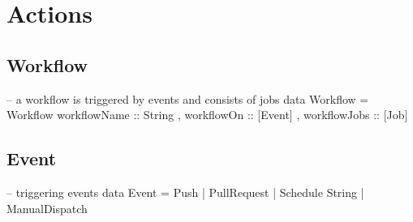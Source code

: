 \documentclass[openany, 12pt]{book}
\begin{document}
\part{Actions}
\chapter{Workflow}

\begin{haskell}{}
-- a workflow is triggered by events and consists of jobs
data Workflow = Workflow
  { workflowName :: String
  , workflowOn   :: [Event]
  , workflowJobs :: [Job]
  }
\end{haskell}

\chapter{Event}
\begin{haskell}{}
-- triggering events
data Event =
      Push
    | PullRequest
    | Schedule String
    | ManualDispatch
\end{haskell}
\end{document}
